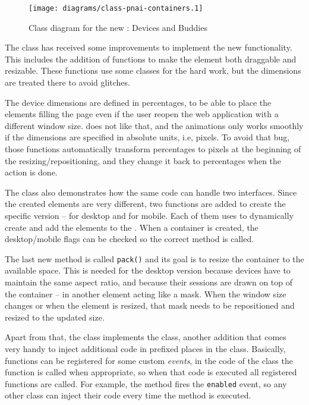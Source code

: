 \begin{figure}[htbp]
  \centering
    \texttt{[image: diagrams/class-pnai-containers.1]}
  \caption{Class diagram for the new : Devices and Buddies}
  \label{fig:class-pnai-containers}
\end{figure}

The  class has received some improvements to implement the new functionality.
This includes the addition of functions to make the  element both draggable and resizable.
These functions use some  classes for the hard work, but the dimensions are treated there to avoid  glitches.

The device dimensions are defined in percentages, to be able to place the elements filling the page even if the user reopen the web application with a different window size.
 does not like that, and the animations only works smoothly if the dimensions are specified in absolute units, i.e, pixels.
To avoid that bug, those functions automatically transform percentages to pixels at the beginning of the resizing/repositioning, and they change it back to percentages when the action is done.

The  class also demonstrates how the same code can handle two interfaces.
Since the created elements are very different, two functions are added to create the specific version --  for desktop and  for mobile.
Each of them uses  to dynamically create and add the elements to the .
When a container is created, the desktop/mobile flags can be checked so the correct method is called.

The last new method is called \texttt{pack()} and its goal is to resize the container to the available space.
This is needed for the desktop version because devices have to maintain the same aspect ratio, and because their sessions are drawn on top of the container -- in another element acting like a mask.
When the window size changes or when the element is resized, that mask needs to be repositioned and resized to the updated size.

Apart from that, the class implements the  class, another  addition that comes very handy to inject additional code in prefixed places in the class.
Basically, functions can be registered for some custom \emph{events}, in the code of the class the  function is called when appropriate, so when that code is executed all registered functions are called.
For example, the  method fires the \texttt{enabled} event, so any other class can inject their code every time the  method is executed.


